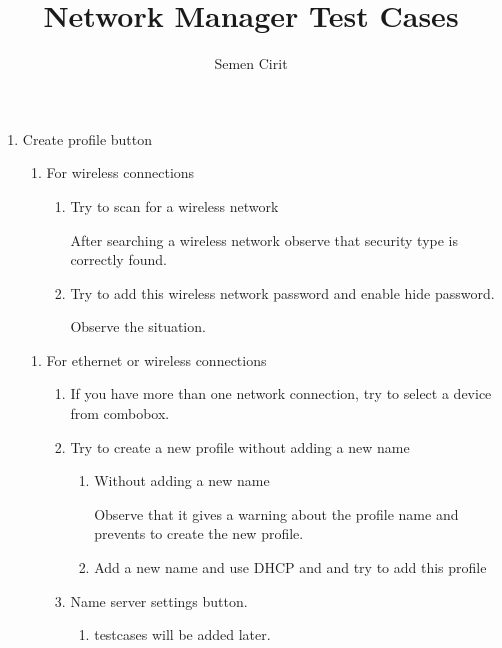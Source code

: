 \documentclass[a4paper,10pt]{article}
\title{Network Manager Test Cases}
\author{Semen Cirit}
\begin{document}
\maketitle

\begin{enumerate}
\item Create profile button
    \begin{enumerate}
    \item For wireless connections
        \begin{enumerate}
        \item Try to scan for a wireless network
    
            After searching a wireless network observe that security type is correctly found.
        \item Try to add this wireless network password and enable hide password.
    
            Observe the situation.
        \end{enumerate}
    \end{enumerate}

    \begin{enumerate}
    \item For ethernet or wireless connections
        \begin{enumerate}
        \item If you have more than one network connection, try to select a device from combobox.
        \item Try to create a new profile without adding a new name
            \begin{enumerate}
            \item Without adding a new name
    
                Observe that it gives a warning about the profile name and prevents to create the new profile.
    
            \item Add a new name and use DHCP and  and try to add this profile
            \end{enumerate}

        \item Name server settings button.
            \begin{enumerate}
            \item testcases will be added later.
            \end{enumerate}
        \end{enumerate}
    \end{enumerate}


\end{enumerate}
\end{document}
